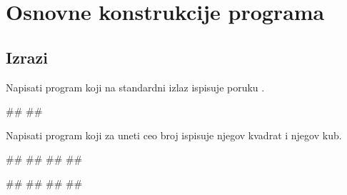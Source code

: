 \renewcommand{\chaptermark}[1]{\markboth{\thechapter\ #1}{#1}}
\renewcommand{\sectionmark}[1]{\markright{\thesection\ #1}}


\chapter{Osnovne konstrukcije programa}


\setcounter{page}{1}


\section{Izrazi}

\begin{Exercise}[label=UZ_NI_01] 
Napisati program koji na standardni izlaz ispisuje poruku .

\begin{miditest}
\begin{upotreba}{1}
#\naslovInt#
##
\end{upotreba}
\end{miditest}

\end{Exercise}
\ifresenja
\begin{Answer}[ref=UZ_NI_01]
\end{Answer}
\fi



\begin{Exercise}[label=UZ_NI_02] 
Napisati program koji za uneti ceo broj ispisuje njegov kvadrat i njegov kub. 

\begin{miditest}
\begin{upotreba}{1}
#\naslovInt#
##
##
##
\end{upotreba}
\end{miditest}
\begin{miditest}
\begin{upotreba}{2}
#\naslovInt#
##
##
##
\end{upotreba}
\end{miditest}

\end{Exercise}
\ifresenja
\begin{Answer}[ref=UZ_NI_02]
\end{Answer}
\fi


